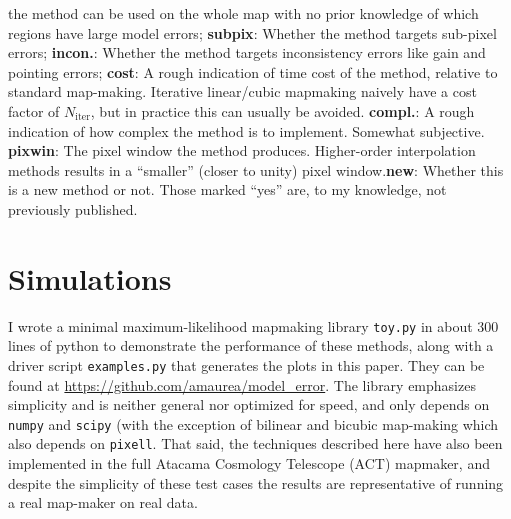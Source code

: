 \documentclass{article}
\newcommand{\code}[1]{\texttt{#1}}
\newcommand{\dfn}[1]{\textbf{#1}}
\begin{document}
\begin{table}
{		the method can be used on the whole map with no prior knowledge of which regions have
		large model errors; \dfn{subpix}: Whether the method targets sub-pixel errors;
		\dfn{incon.}: Whether the method targets inconsistency errors like gain and pointing
		errors; \dfn{cost}: A rough indication of time cost of the method, relative to
		standard map-making. Iterative linear/cubic mapmaking naively have a cost factor of
		$N_\textrm{iter}$, but in practice this can usually be avoided. \dfn{compl.}:
		A rough indication of how complex the method is to implement. Somewhat subjective.
		\dfn{pixwin}:
		The pixel window the method produces. Higher-order interpolation methods results in
		a ``smaller'' (closer to unity) pixel window.\dfn{new}: Whether this is a new
		method or not. Those marked ``yes'' are, to my knowledge, not previously published.}
	\label{tab:summary}
\end{table}

\section{Simulations}
I wrote a minimal maximum-likelihood
mapmaking library \code{toy.py} in about 300 lines of python to demonstrate the performance of these
methods, along with a driver script \code{examples.py}
that generates the plots in this paper. They can be found at \url{https://github.com/amaurea/model_error}.
The library emphasizes simplicity and is neither general
nor optimized for speed, and only depends on \code{numpy} and \code{scipy} (with
the exception of bilinear and bicubic map-making which also depends on \code{pixell}.
That said, the techniques described here have also been implemented in
the full Atacama Cosmology Telescope (ACT) mapmaker, and despite the simplicity of these test cases
the results are representative of running a real map-maker on real data.
\end{document}
